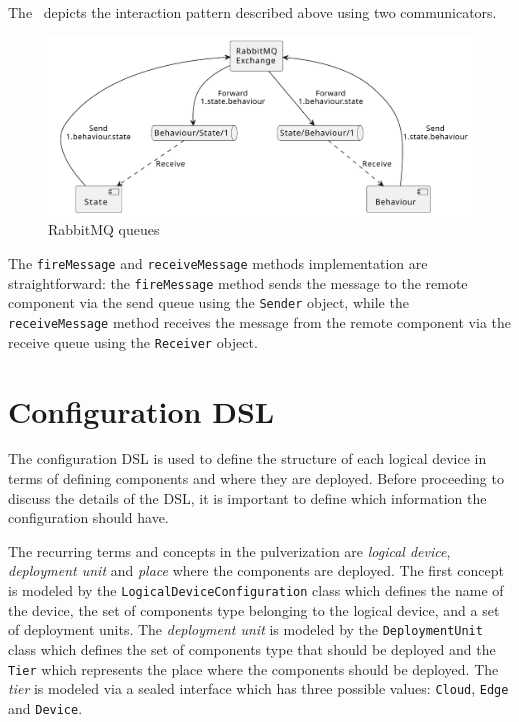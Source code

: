 The~ depicts the interaction pattern described above using two communicators.

\begin{figure}
	\centering
	\includegraphics[width=\textwidth]{figures/rabbitmq-queue.pdf}
	\caption{RabbitMQ queues}
	\label{fig:rabbitmq-queues}
\end{figure}

The \texttt{fireMessage} and \texttt{receiveMessage} methods implementation are straightforward: the \texttt{fireMessage} method sends the message
to the remote component via the send queue using the \texttt{Sender} object, while the \texttt{receiveMessage} method receives the message from the
remote component via the receive queue using the \texttt{Receiver} object.


\section{Configuration DSL}
\label{sec:configuration-dsl-impl}


The configuration DSL is used to define the structure of each logical device in terms of defining components and where they are deployed.
Before proceeding to discuss the details of the DSL, it is important to define which information the configuration should have.

The recurring terms and concepts in the pulverization are \emph{logical device}, \emph{deployment unit} and \emph{place} where the components are
deployed. The first concept is modeled by the \texttt{LogicalDeviceConfiguration} class which defines the name of the device, the set of components
type belonging to the logical device, and a set of deployment units.
The \emph{deployment unit} is modeled by the \texttt{DeploymentUnit} class which defines the set of components type that should be deployed and the
\texttt{Tier} which represents the place where the components should be deployed. The \emph{tier} is modeled via a sealed interface which has
three possible values: \texttt{Cloud}, \texttt{Edge} and \texttt{Device}.

